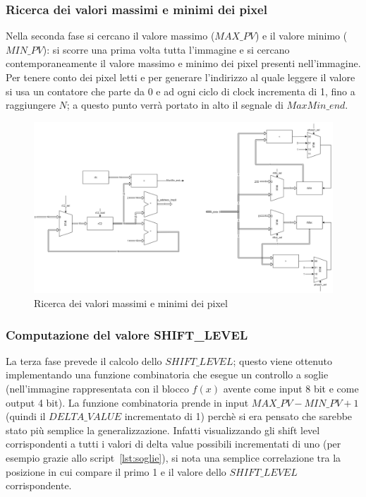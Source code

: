 \documentclass[11pt]{article} %
\begin{document}
\subsubsection{Ricerca dei valori massimi e minimi dei pixel}
Nella seconda fase si cercano il valore massimo ($MAX\_PV$) e il valore minimo ($MIN\_PV$): si scorre una prima volta tutta l'immagine e si cercano contemporaneamente il valore massimo e minimo dei pixel presenti nell'immagine. Per tenere conto dei pixel letti e per generare l'indirizzo al quale leggere il valore si usa un contatore che parte da 0 e ad ogni ciclo di clock incrementa di 1, fino a raggiungere $N$; a questo punto verrà portato in alto il segnale di $MaxMin\_end$.

\begin{figure}[h]
\centering
\includegraphics[width=120mm]{datapaths/regMax_regMin.png}
\caption{Ricerca dei valori massimi e minimi dei pixel}
\end{figure}


\subsubsection{Computazione del valore SHIFT\_LEVEL}
La terza fase prevede il calcolo dello $SHIFT\_LEVEL$; questo viene ottenuto implementando una funzione combinatoria che esegue un controllo a soglie (nell'immagine rappresentata con il blocco $f(x)$ avente come input 8 bit e come output 4 bit). La funzione combinatoria prende in input $MAX\_PV - MIN\_PV + 1$ (quindi il $DELTA\_VALUE$ incrementato di 1) perchè si era pensato che sarebbe stato più semplice la generalizzazione. Infatti visualizzando gli shift level corrispondenti a tutti i valori di delta value possibili incrementati di uno (per esempio grazie allo script~\ref{lst:soglie}), si nota una semplice correlazione tra la posizione in cui compare il primo 1 e il valore dello $SHIFT\_LEVEL$ corrispondente.
\end{document}
